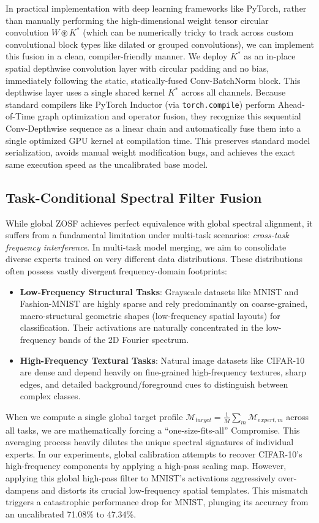 \documentclass{article}
\theoremstyle{plain}
\theoremstyle{definition}
\theoremstyle{remark}
\begin{document}
In practical implementation with deep learning frameworks like PyTorch, rather than manually performing the high-dimensional weight tensor circular convolution $W \circledast K^*$ (which can be numerically tricky to track across custom convolutional block types like dilated or grouped convolutions), we can implement this fusion in a clean, compiler-friendly manner. We deploy $K^*$ as an in-place spatial depthwise convolution layer with circular padding and no bias, immediately following the static, statically-fused Conv-BatchNorm block. This depthwise layer uses a single shared kernel $K^*$ across all channels. Because standard compilers like PyTorch Inductor (via \texttt{torch.compile}) perform Ahead-of-Time graph optimization and operator fusion, they recognize this sequential Conv-Depthwise sequence as a linear chain and automatically fuse them into a single optimized GPU kernel at compilation time. This preserves standard model serialization, avoids manual weight modification bugs, and achieves the exact same execution speed as the uncalibrated base model.

\subsection{Task-Conditional Spectral Filter Fusion}
While global ZOSF achieves perfect equivalence with global spectral alignment, it suffers from a fundamental limitation under multi-task scenarios: \emph{cross-task frequency interference}. In multi-task model merging, we aim to consolidate diverse experts trained on very different data distributions. These distributions often possess vastly divergent frequency-domain footprints:
\begin{itemize}
    \item \textbf{Low-Frequency Structural Tasks}: Grayscale datasets like MNIST and Fashion-MNIST are highly sparse and rely predominantly on coarse-grained, macro-structural geometric shapes (low-frequency spatial layouts) for classification. Their activations are naturally concentrated in the low-frequency bands of the 2D Fourier spectrum.
    \item \textbf{High-Frequency Textural Tasks}: Natural image datasets like CIFAR-10 are dense and depend heavily on fine-grained high-frequency textures, sharp edges, and detailed background/foreground cues to distinguish between complex classes.
\end{itemize}

When we compute a single global target profile $\mathcal{M}_{target} = \frac{1}{M}\sum_m \mathcal{M}_{expert, m}$ across all tasks, we are mathematically forcing a ``one-size-fits-all'' Compromise. This averaging process heavily dilutes the unique spectral signatures of individual experts. In our experiments, global calibration attempts to recover CIFAR-10's high-frequency components by applying a high-pass scaling map. However, applying this global high-pass filter to MNIST's activations aggressively over-dampens and distorts its crucial low-frequency spatial templates. This mismatch triggers a catastrophic performance drop for MNIST, plunging its accuracy from an uncalibrated 71.08\% to 47.34\%.
\end{document}

